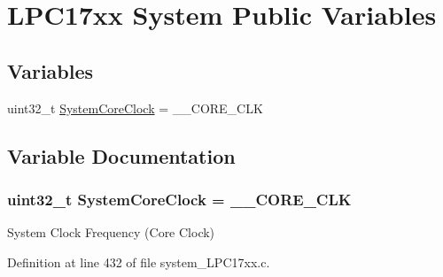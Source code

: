 \hypertarget{group___l_p_c17xx___system___public___variables}{\section{\-L\-P\-C17xx \-System \-Public \-Variables}
\label{group___l_p_c17xx___system___public___variables}
}
\subsection*{\-Variables}
\begin{DoxyCompactItemize}
\item 
uint32\-\_\-t \hyperlink{group___l_p_c17xx___system___public___variables_gaa3cd3e43291e81e795d642b79b6088e6}{\-System\-Core\-Clock} = \-\_\-\-\_\-\-C\-O\-R\-E\-\_\-\-C\-L\-K
\end{DoxyCompactItemize}


\subsection{\-Variable \-Documentation}
\hypertarget{group___l_p_c17xx___system___public___variables_gaa3cd3e43291e81e795d642b79b6088e6}{
\subsubsection[{\-System\-Core\-Clock}]{\setlength{\rightskip}{0pt plus 5cm}uint32\-\_\-t {\bf \-System\-Core\-Clock} = \-\_\-\-\_\-\-C\-O\-R\-E\-\_\-\-C\-L\-K}}\label{group___l_p_c17xx___system___public___variables_gaa3cd3e43291e81e795d642b79b6088e6}
\-System \-Clock \-Frequency (\-Core \-Clock) 

\-Definition at line 432 of file system\-\_\-\-L\-P\-C17xx.\-c.

